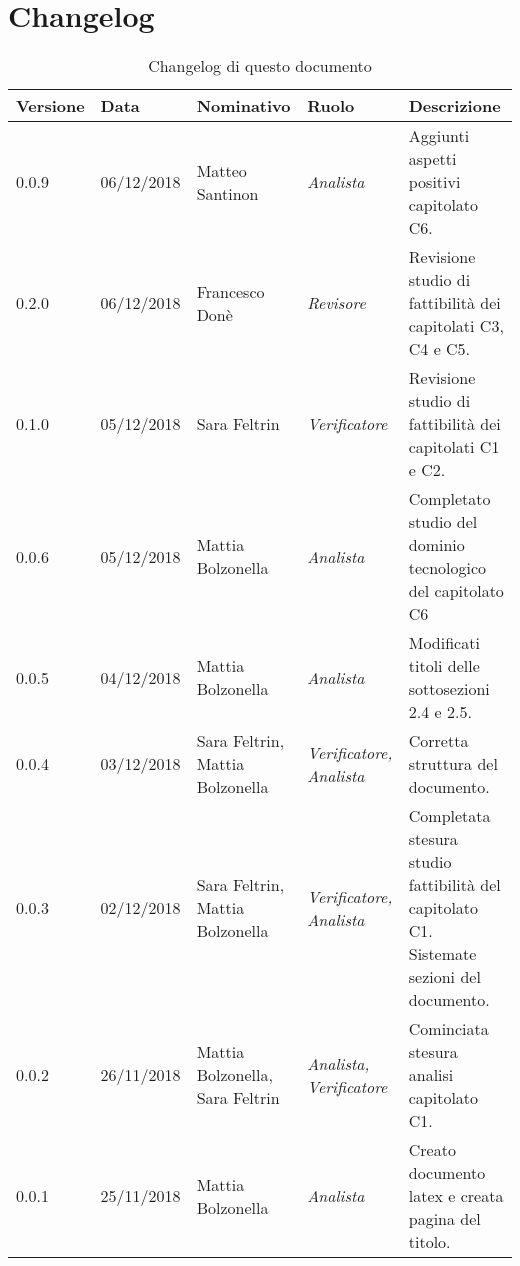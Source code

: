 \section{Changelog}
\begin{table}[tbph]
        \centering
        \begin{tabularx}{\textwidth}{|l|l|l|l|X|}
                \hline
                \textbf{Versione} & \textbf{Data} & \textbf{Nominativo}  & \textbf{Ruolo} & 
                \textbf{Descrizione}\\
                \hline \hline

                0.0.9 & 06/12/2018 & Matteo Santinon & \textit{Analista} & 
              	Aggiunti aspetti positivi capitolato C6.\\
                
              	\hline
              	0.2.0 & 06/12/2018 & Francesco Donè & \textit{Revisore} & 
              	Revisione studio di fattibilità dei capitolati C3, C4 e C5.\\
                
                \hline
                0.1.0 & 05/12/2018 & Sara Feltrin & \textit{Verificatore} & 
                Revisione studio di fattibilità dei capitolati C1 e C2.\\
              
                \hline
                0.0.6 & 05/12/2018 & Mattia Bolzonella & \textit{Analista} & 
                Completato studio del dominio tecnologico del capitolato C6\\
                
                \hline
                0.0.5 & 04/12/2018 & Mattia Bolzonella & \textit{Analista} & 
                Modificati titoli delle sottosezioni 2.4 e 2.5. \\
                
                \hline
                0.0.4 & 03/12/2018 & Sara Feltrin, Mattia Bolzonella 
                & \textit{Verificatore, Analista} & Corretta struttura del documento. \\
                
                \hline
                0.0.3 & 02/12/2018 & Sara Feltrin, Mattia Bolzonella & \textit{Verificatore, Analista}
                & Completata stesura studio fattibilità del capitolato C1.
                Sistemate sezioni del documento. \\
                
                \hline
                0.0.2 & 26/11/2018 & Mattia Bolzonella, Sara Feltrin & \textit{Analista, Verificatore}
                & Cominciata stesura analisi capitolato C1.\\

                \hline
                0.0.1 & 25/11/2018 & Mattia Bolzonella & \textit{Analista}
                & Creato documento latex e creata pagina del titolo.\\
                
                \hline
                
        \end{tabularx}
        \caption{Changelog di questo documento}
\end{table}